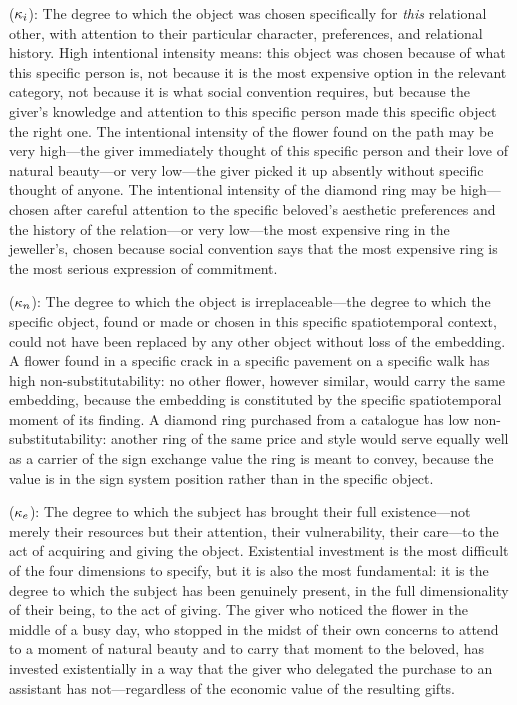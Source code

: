  ($\kappa_i$): The degree to which the object was chosen specifically for \emph{this} relational other, with attention to their particular character, preferences, and relational history. High intentional intensity means: this object was chosen because of what this specific person is, not because it is the most expensive option in the relevant category, not because it is what social convention requires, but because the giver's knowledge and attention to this specific person made this specific object the right one. The intentional intensity of the flower found on the path may be very high---the giver immediately thought of this specific person and their love of natural beauty---or very low---the giver picked it up absently without specific thought of anyone. The intentional intensity of the diamond ring may be high---chosen after careful attention to the specific beloved's aesthetic preferences and the history of the relation---or very low---the most expensive ring in the jeweller's, chosen because social convention says that the most expensive ring is the most serious expression of commitment.

 ($\kappa_n$): The degree to which the object is irreplaceable---the degree to which the specific object, found or made or chosen in this specific spatiotemporal context, could not have been replaced by any other object without loss of the embedding. A flower found in a specific crack in a specific pavement on a specific walk has high non-substitutability: no other flower, however similar, would carry the same embedding, because the embedding is constituted by the specific spatiotemporal moment of its finding. A diamond ring purchased from a catalogue has low non-substitutability: another ring of the same price and style would serve equally well as a carrier of the sign exchange value the ring is meant to convey, because the value is in the sign system position rather than in the specific object.

 ($\kappa_e$): The degree to which the subject has brought their full existence---not merely their resources but their attention, their vulnerability, their care---to the act of acquiring and giving the object. Existential investment is the most difficult of the four dimensions to specify, but it is also the most fundamental: it is the degree to which the subject has been genuinely present, in the full dimensionality of their being, to the act of giving. The giver who noticed the flower in the middle of a busy day, who stopped in the midst of their own concerns to attend to a moment of natural beauty and to carry that moment to the beloved, has invested existentially in a way that the giver who delegated the purchase to an assistant has not---regardless of the economic value of the resulting gifts.

